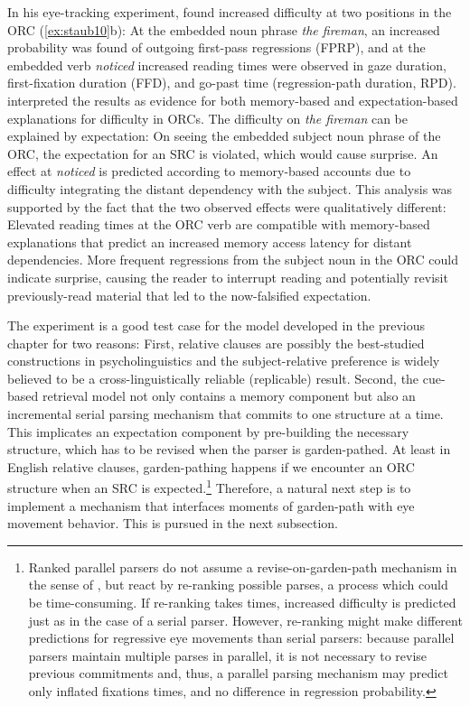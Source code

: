\documentclass{cambridge7A}\usepackage[]{graphicx}\usepackage[]{color}
\begin{document}
In his eye-tracking experiment, \cite{Staub2010a} found increased difficulty at two positions in the ORC (\ref{ex:staub10}b): At the embedded noun phrase \textit{the fireman}, an increased probability was found of outgoing first-pass regressions (FPRP), and at the embedded verb \textit{noticed} increased reading times were observed in gaze duration, first-fixation duration (FFD), and go-past time (regression-path duration, RPD). 
\cite{Staub2010a} interpreted the results as evidence for both memory-based and expectation-based explanations for difficulty in ORCs. The difficulty on \emph{the fireman} can be explained by expectation: On seeing the embedded subject noun phrase of the ORC, the expectation for an SRC is violated, which would cause surprise. An effect at \textit{noticed} is predicted according to memory-based accounts due to difficulty integrating the distant dependency with the subject.
This analysis was supported by the fact that the two observed effects were qualitatively different: Elevated reading times at the ORC verb are compatible with memory-based explanations that predict an increased memory access latency for distant dependencies. More frequent regressions from the subject noun in the ORC  could indicate surprise, causing the reader to interrupt reading and potentially revisit previously-read material that led to the now-falsified expectation.

The \cite{Staub2010a} experiment is a good test case for the model developed in the previous chapter for two reasons: First, relative clauses are possibly the best-studied constructions in psycholinguistics and the subject-relative preference is widely believed to be a cross-linguistically reliable (replicable) result. Second, the cue-based retrieval model not only contains a memory component but also an incremental serial parsing mechanism that commits to one structure at a time. This implicates an expectation component by pre-building the necessary structure, which has to be revised when the parser is garden-pathed. At least in English relative clauses, garden-pathing happens if we encounter an ORC structure when an SRC is expected.\footnote{Ranked parallel parsers do not assume a revise-on-garden-path mechanism in the sense of \cite{FrazierRayner1982}, but react by re-ranking possible parses, a process which could be time-consuming. If re-ranking takes times, increased difficulty is predicted just as in the case of a serial parser. However, re-ranking might make different predictions for regressive eye movements than serial parsers: because parallel parsers maintain multiple parses in parallel, it is not necessary to revise previous commitments and, thus, a parallel parsing mechanism may predict only inflated fixations times, and no difference in regression probability.} 
Therefore, a natural next step is to implement a mechanism that interfaces moments of garden-path with eye movement behavior. This is pursued in the next subsection.
\end{document}
